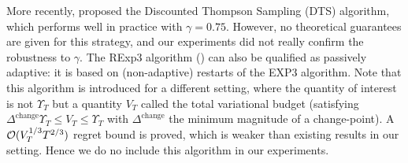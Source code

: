 More recently, \cite{RajKalyani17} proposed the Discounted Thompson Sampling (DTS) algorithm, which performs well in practice with $\gamma=0.75$. However, no theoretical guarantees are given for this strategy, and our experiments did not really confirm the robustness to $\gamma$.
%
The RExp3 algorithm (\cite{Besbes14stochastic}) can also be qualified as passively adaptive: it is based on (non-adaptive) restarts of the EXP3 algorithm. Note that this algorithm is introduced for a different setting, where the quantity of interest is not $\Upsilon_T$ but a quantity $V_T$ called the total variational budget (satisfying $\Delta^{\text{change}} \Upsilon_T \leq V_T \leq \Upsilon_T$ with $\Delta^{\text{change}}$ the minimum magnitude of a change-point). A  $\mathcal{O}(V_T^{1/3} T^{2/3})$ regret bound is proved, which is weaker than existing results in our setting. Hence we do no include this algorithm in our experiments.



